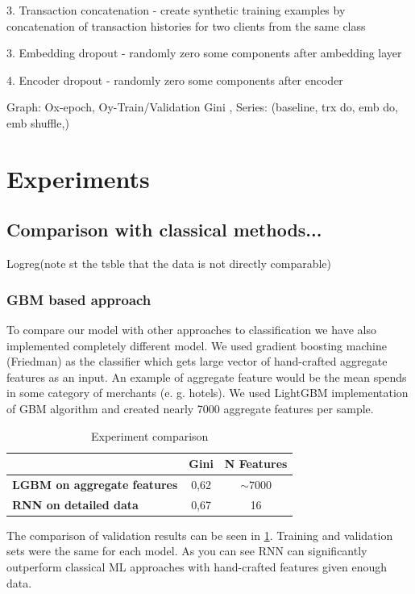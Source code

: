 \documentclass{sigkddExp}
\begin{document}
3. Transaction concatenation - create synthetic training examples by concatenation of 
transaction histories for two clients from the same class

3. Embedding dropout - randomly zero some components after ambedding layer

4. Encoder dropout - randomly zero some components after encoder




Graph: Ox-epoch, Oy-Train/Validation Gini , Series: (baseline, trx do, emb do, emb shuffle,)

\section{Experiments}
\subsection{Comparison with classical methods...}

Logreg(note st the tsble that the data is not directly comparable)

\subsubsection{GBM based approach}

To compare our model with other approaches to classification we have also implemented completely different model. We used gradient boosting machine (Friedman\cite{friedman2001greedy}) as the classifier which gets large vector of hand-crafted aggregate features as an input. An example of aggregate feature would be the mean spends in some category of merchants (e. g. hotels).
We used LightGBM\cite{Ke2017LightGBMAH} implementation of GBM algorithm and created nearly 7000 aggregate features per sample.

\begin{table}
\caption{Experiment comparison}
\begin{tabular}{ | l | c | c | }
\hline
& \textbf{Gini} & \textbf{N Features} \\
\hline
\textbf{LGBM on aggregate features} & 0,62 & $\sim7000$ \\
\textbf{RNN on detailed data} & 0,67 & 16 \\
\hline
\end{tabular}
\label{tab2}
\end{table}


The comparison of validation results can be seen in \ref{tab2}. Training and validation sets were the same for each model.  As you can see RNN can significantly outperform classical ML approaches with hand-crafted features given enough data.
\end{document}
